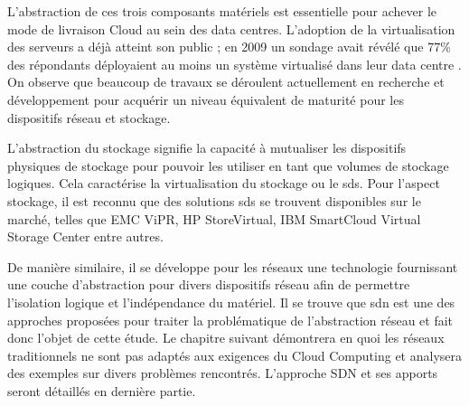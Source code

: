 L'abstraction de ces trois composants matériels est essentielle pour achever le mode de livraison Cloud au sein des data centres. L'adoption de la virtualisation des serveurs a déjà atteint son public ; en 2009 un sondage avait révélé que 77\% des répondants déployaient au moins un système virtualisé dans leur data centre \cite{x86ServersVirtualization}. On observe que beaucoup de travaux se déroulent actuellement en recherche et développement pour acquérir un niveau équivalent de maturité pour les dispositifs réseau et stockage. 

L'abstraction du stockage signifie la capacité à mutualiser les dispositifs physiques de stockage pour pouvoir les utiliser en tant que volumes de stockage logiques. Cela caractérise la virtualisation du stockage ou le \gls{sds}. Pour l'aspect stockage, il est reconnu que des solutions \gls{sds} se trouvent disponibles sur le marché, telles que EMC ViPR, HP StoreVirtual, IBM SmartCloud Virtual Storage Center entre autres.

De manière similaire, il se développe pour les réseaux une technologie fournissant une couche d'abstraction pour divers dispositifs réseau afin de permettre l'isolation logique et l'indépendance du matériel. Il se trouve que \gls{sdn} est une des approches proposées pour traiter la problématique de l'abstraction réseau et fait donc l'objet de cette étude. Le chapitre suivant démontrera en quoi les réseaux traditionnels ne sont pas adaptés aux exigences du Cloud Computing et analysera des exemples sur divers problèmes rencontrés. L'approche SDN et ses apports seront détaillés en dernière partie.
\cite{ibmPlanningVirtCCchap1}  \cite{cloudReadyJuniperReferenceDef} \cite{journeySDDC} \cite{ciscoCCDCStrategyArchiSolutions}

